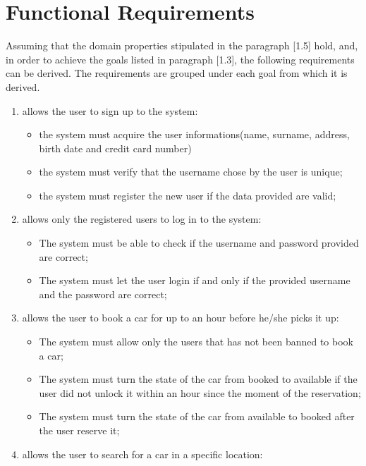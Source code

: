 \section{Functional Requirements}
Assuming that the domain properties stipulated in the paragraph [1.5] hold, and, in order to achieve the goals listed in paragraph [1.3], the following requirements can be derived. The requirements are grouped under each goal from which it is derived.

\begin{enumerate}
\item allows the user to sign up to the system:

\begin{itemize}
\item the system must acquire the user informations(name, surname, address, birth date and credit card number)
\item the system must verify that the username chose by the user is unique;
\item the system must register the new user if the data provided are valid;
\end{itemize}

\item allows only the registered users to log in to the system:

\begin{itemize}
\item The system must be able to check if the username and password provided are correct;
\item The system must let the user login if and only if the provided username and the password are correct;
\end{itemize}

\item allows the user to book a car for up to an hour before he/she picks it up:

\begin{itemize}
\item The system must allow only the users that has not been banned to book a car;
\item The system must turn the state of the car from booked to available if the user did not unlock it within an hour since the moment of the reservation;
\item The system must turn the state of the car from available to booked after the user reserve it;
\end{itemize}

\item allows the user to search for a car in a specific location:


\end{enumerate}
